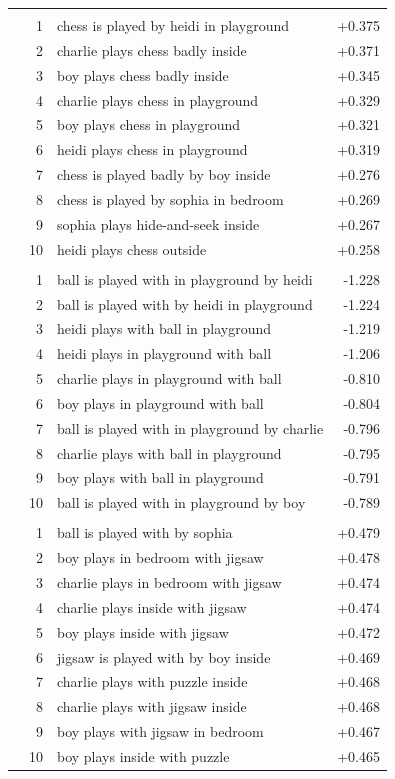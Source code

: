 \begin{longtable}{@{}lrlr@{}}
\addlinespace[3pt]
\multicolumn{4}{l}{\textit{Complex Event -- Easiest}} \\
 & 1 & chess is played by heidi in playground & +0.375 \\
 & 2 & charlie plays chess badly inside & +0.371 \\
 & 3 & boy plays chess badly inside & +0.345 \\
 & 4 & charlie plays chess in playground & +0.329 \\
 & 5 & boy plays chess in playground & +0.321 \\
 & 6 & heidi plays chess in playground & +0.319 \\
 & 7 & chess is played badly by boy inside & +0.276 \\
 & 8 & chess is played by sophia in bedroom & +0.269 \\
 & 9 & sophia plays hide-and-seek inside & +0.267 \\
 & 10 & heidi plays chess outside & +0.258 \\
\addlinespace
\multicolumn{4}{l}{\textit{Basic Event -- Hardest}} \\
 & 1 & ball is played with in playground by heidi & -1.228 \\
 & 2 & ball is played with by heidi in playground & -1.224 \\
 & 3 & heidi plays with ball in playground & -1.219 \\
 & 4 & heidi plays in playground with ball & -1.206 \\
 & 5 & charlie plays in playground with ball & -0.810 \\
 & 6 & boy plays in playground with ball & -0.804 \\
 & 7 & ball is played with in playground by charlie & -0.796 \\
 & 8 & charlie plays with ball in playground & -0.795 \\
 & 9 & boy plays with ball in playground & -0.791 \\
 & 10 & ball is played with in playground by boy & -0.789 \\
\addlinespace[3pt]
\multicolumn{4}{l}{\textit{Basic Event -- Easiest}} \\
 & 1 & ball is played with by sophia & +0.479 \\
 & 2 & boy plays in bedroom with jigsaw & +0.478 \\
 & 3 & charlie plays in bedroom with jigsaw & +0.474 \\
 & 4 & charlie plays inside with jigsaw & +0.474 \\
 & 5 & boy plays inside with jigsaw & +0.472 \\
 & 6 & jigsaw is played with by boy inside & +0.469 \\
 & 7 & charlie plays with puzzle inside & +0.468 \\
 & 8 & charlie plays with jigsaw inside & +0.468 \\
 & 9 & boy plays with jigsaw in bedroom & +0.467 \\
 & 10 & boy plays inside with puzzle & +0.465 \\
\end{longtable}
\normalsize
